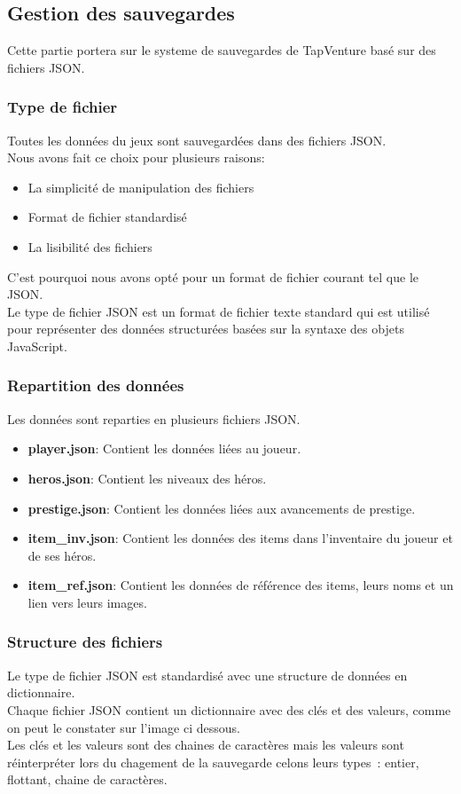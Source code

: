 \documentclass[11pt,a4paper]{article}
\begin{document}
\subsection{Gestion des sauvegardes}
Cette partie portera sur le systeme de sauvegardes de TapVenture basé sur des fichiers JSON.
\subsubsection{Type de fichier}
Toutes les données du jeux sont sauvegardées dans des fichiers JSON.\\
Nous avons fait ce choix pour plusieurs raisons:
\begin{itemize}
    \item La simplicité de manipulation des fichiers
    \item Format de fichier standardisé
    \item La lisibilité des fichiers
\end{itemize}
C'est pourquoi nous avons opté pour un format de fichier courant tel que le JSON.\\
Le type de fichier JSON est un format de fichier texte standard qui est utilisé pour représenter des données structurées basées sur la syntaxe des objets JavaScript. 

\subsubsection{Repartition des données}
Les données sont reparties en plusieurs fichiers JSON.
\begin{itemize}
    \item \textbf{player.json}: Contient les données liées au joueur.
    \item \textbf{heros.json}: Contient les niveaux des héros.
    \item \textbf{prestige.json}: Contient les données liées aux avancements de prestige.
    \item \textbf{item\_inv.json}: Contient les données des items dans l'inventaire du joueur et de ses héros.
    \item \textbf{item\_ref.json}: Contient les données de référence des items, leurs noms et un lien vers leurs images.
\end{itemize}

\subsubsection{Structure des fichiers}
Le type de fichier JSON est standardisé avec une structure de données en dictionnaire.\\
Chaque fichier JSON contient un dictionnaire avec des clés et des valeurs, comme on peut le constater sur l'image ci dessous.\\
Les clés et les valeurs sont des chaines de caractères mais les valeurs sont réinterpréter lors du chagement de la sauvegarde celons leurs types~: entier, flottant, chaine de caractères.\\
\end{document}
